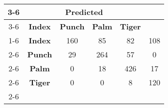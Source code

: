 \documentclass{standalone}
\begin{document}
 
 \begin{tabular}{|c |c |c |c |c |c |}
\cline{3-6}\multicolumn{2}{c|}{} & \multicolumn{4}{c|}{\textbf{Predicted}} \\ 
\cline{3-6} \multicolumn{2}{c |}{ } & \textbf{Index} & \textbf{Punch} & \textbf{Palm} & \textbf{Tiger}\\ 
\cline{1-6}\multirow{4}{*}{\rotatebox[origin=c]{90}{\textbf{Actual}}} & \textbf{Index} & 160 & 85 & 82 & 108\\ 
 \cline{2-6} & \textbf{Punch} & 29 & 264 & 57 & 0\\ 
 \cline{2-6} & \textbf{Palm} & 0 & 18 & 426 & 17\\ 
 \cline{2-6} & \textbf{Tiger} & 0 & 0 & 8 & 120\\ 
 \cline{2-6}\hline \end{tabular}
 
\end{document}
